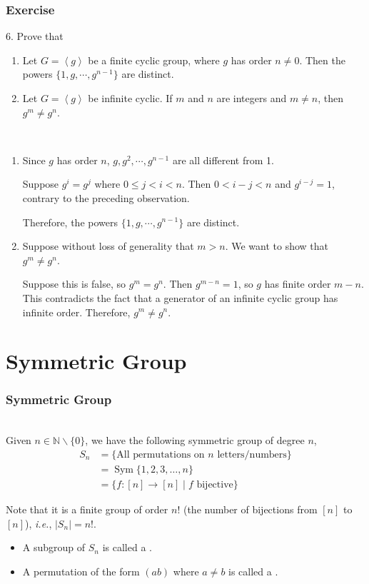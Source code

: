 \documentclass{beamer}
\newcommand{\myfont}{\rmfamily\normalsize\upshape\mdseries}
\newcommand{\mydef}[1]{\sffamily\blue{#1}\myfont\\} %
\begin{document}
\begin{frame}
    \frametitle{Exercise}  
    6. Prove that
    \begin{enumerate}
        \item Let $G = \left\langle g \right\rangle$ be a finite cyclic group, where $g$ has order $n \neq 0$. Then the powers $\{1, g, \cdots , g^{n-1}\}$ are distinct.
        \item Let $G = \left\langle g\right\rangle $ be infinite cyclic. If $m$ and $n$ are integers and $m \neq n$, then $g^m \neq g^n$.
    \end{enumerate}
    \\
    \begin{enumerate}
        \item Since $g$ has order $n$, $g, g^2, \cdots, g^{n-1}$ are all different from 1.
        \par Suppose $g^i = g^j$ where $0 \leqslant j < i < n$. Then $0 < i - j < n$ and $g^{i-j} = 1$, contrary to the preceding observation.
        \par Therefore, the powers $\{1, g, \cdots , g^{n-1}\}$ are distinct.
        \item Suppose without loss of generality that $m > n$. We want to show that $g^m \neq g^n$.
        \par Suppose this is false, so  $g^m = g^n$. Then $g^{m-n} = 1$, so $g$ has finite order $m-n$. This contradicts the fact that a	generator of an infinite cyclic group has infinite order. Therefore,  $g^m \neq g^n$.
    \end{enumerate}
\end{frame}


\section{Symmetric Group}
\begin{frame}
    \frametitle{Symmetric Group}
    \mydef{Definition}
    \hh Given $n \in \mathbb{N} \backslash \{0\}$, we have the following symmetric group of degree $n$,
    $$
    \begin{aligned}
    S_{n} &=\{\text {All permutations on } n \text { letters/numbers}\} \\
    &=\operatorname{Sym}\{1,2,3, \ldots, n\} \\
    &=\{f:[n] \rightarrow[n] \mid f \text { bijective}\}
    \end{aligned}
    $$

    Note that it is a finite group of order $n!$ (the number of bijections from $[n]$ to $[n]$), 
    \textit{i.e.}, $|S_n| = n!$.
    \\
    \vv 
    \begin{itemize}
        \item  A subgroup of $S_n$ is called a \textbf{}.
        \item A permutation of the form $(ab)$ where $a \neq b$ 
        is called a \textbf{}. 
    \end{itemize}
\end{frame}
\end{document}
